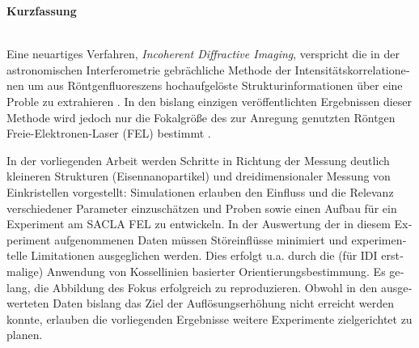  \begin{otherlanguage}{german}
 \begin{Huge}
 	\textbf{Kurzfassung}\vspace{12mm}
 \end{Huge}
\\
Eine neuartiges Verfahren, \textit{Incoherent Diffractive Imaging}, verspricht die in der astronomischen Interferometrie gebrächliche Methode der Intensitätskorrelationenen um aus Röntgenfluoreszens hochaufgelöste Strukturinformationen über eine Proble zu extrahieren \cite{classen2017}.  
In den bislang einzigen veröffentlichten Ergebnissen dieser Methode wird jedoch nur  die Fokalgröße des zur Anregung genutzten Röntgen Freie-Elektronen-Laser (FEL) bestimmt \cite{nakumura2020}.

In der vorliegenden Arbeit werden Schritte in Richtung der Messung deutlich kleineren Strukturen (Eisennanopartikel) und dreidimensionaler Messung von Einkristellen vorgestellt: Simulationen erlauben den Einfluss und die Relevanz verschiedener Parameter einzuschätzen und Proben sowie einen Aufbau für ein Experiment am SACLA FEL zu entwickeln. In der Auswertung der in diesem Experiment aufgenommenen Daten müssen Störeinflüsse minimiert und experimentelle Limitationen ausgeglichen werden. Dies erfolgt u.a. durch die (für IDI erstmalige) Anwendung von Kossellinien basierter Orientierungsbestimmung.  
Es gelang, die Abbildung des Fokus erfolgreich zu reproduzieren.  Obwohl in den ausgewerteten Daten bislang das Ziel der Auflösungserhöhung nicht erreicht werden konnte, erlauben die vorliegenden Ergebnisse weitere Experimente zielgerichtet zu planen.
\end{otherlanguage}